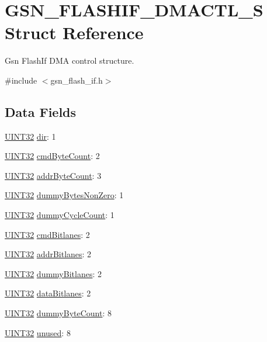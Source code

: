 \hypertarget{a00080}{
\section{GSN\_\-FLASHIF\_\-DMACTL\_\-S Struct Reference}
\label{a00080}
}


Gsn FlashIf DMA control structure.  




{\ttfamily \#include $<$gsn\_\-flash\_\-if.h$>$}

\subsection*{Data Fields}
\begin{DoxyCompactItemize}
\item 
\hyperlink{a00660_gae1e6edbbc26d6fbc71a90190d0266018}{UINT32} \hyperlink{a00080_ab439248638d21e4206cbcf99b82a1363}{dir}: 1
\item 
\hyperlink{a00660_gae1e6edbbc26d6fbc71a90190d0266018}{UINT32} \hyperlink{a00080_ad34d27c213b62c55610918476e3d4ea9}{cmdByteCount}: 2
\item 
\hyperlink{a00660_gae1e6edbbc26d6fbc71a90190d0266018}{UINT32} \hyperlink{a00080_a65a1735cd77a36302c9cadfa1b1a2f17}{addrByteCount}: 3
\item 
\hyperlink{a00660_gae1e6edbbc26d6fbc71a90190d0266018}{UINT32} \hyperlink{a00080_abbd697f4944fb9099180431841727d57}{dummyBytesNonZero}: 1
\item 
\hyperlink{a00660_gae1e6edbbc26d6fbc71a90190d0266018}{UINT32} \hyperlink{a00080_afd1b19aa3a7ccfe803814c9f9c9a6267}{dummyCycleCount}: 1
\item 
\hyperlink{a00660_gae1e6edbbc26d6fbc71a90190d0266018}{UINT32} \hyperlink{a00080_a56e303db1c31bae569294ce41ce90c60}{cmdBitlanes}: 2
\item 
\hyperlink{a00660_gae1e6edbbc26d6fbc71a90190d0266018}{UINT32} \hyperlink{a00080_ac20b4d704a60073489c4a1369c753f88}{addrBitlanes}: 2
\item 
\hyperlink{a00660_gae1e6edbbc26d6fbc71a90190d0266018}{UINT32} \hyperlink{a00080_a75caed3fbf287dd4f43892f6af082cb4}{dummyBitlanes}: 2
\item 
\hyperlink{a00660_gae1e6edbbc26d6fbc71a90190d0266018}{UINT32} \hyperlink{a00080_a6e4d0162b5d0af605625e4e5ff0bb07f}{dataBitlanes}: 2
\item 
\hyperlink{a00660_gae1e6edbbc26d6fbc71a90190d0266018}{UINT32} \hyperlink{a00080_a21d61166cb8456ab28a25eb4f6f81a99}{dummyByteCount}: 8
\item 
\hyperlink{a00660_gae1e6edbbc26d6fbc71a90190d0266018}{UINT32} \hyperlink{a00080_a2c3ace150ddcb10d297a6d30b67d6330}{unused}: 8
\end{DoxyCompactItemize}


